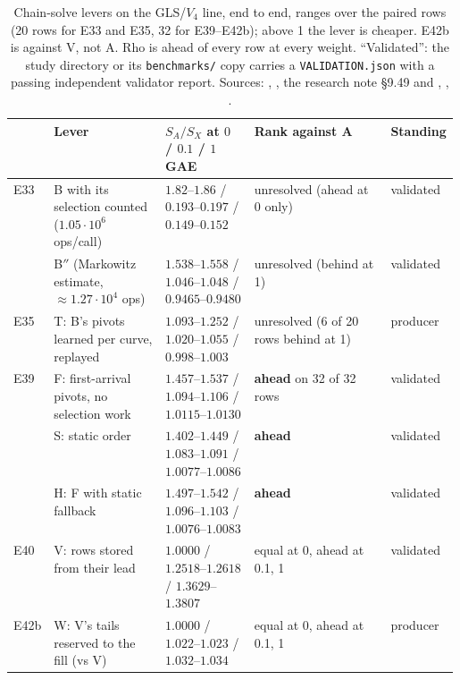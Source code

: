 \begin{table}[t]
\centering\small
\begin{tabularx}{\linewidth}{@{}l>{\raggedright}p{0.25\linewidth}>{\raggedright}p{0.2\linewidth}>{\raggedright}X>{\raggedright\arraybackslash}p{0.13\linewidth}@{}}
\toprule
& Lever & $S_A/S_X$ at $0$ / $0.1$ / $1$ GAE & Rank against A & Standing \\
\midrule
E33 & B with its selection counted ($1.05\cdot10^6$ ops/call) & $1.82$--$1.86$ / $0.193$--$0.197$ / $0.149$--$0.152$ & unresolved (ahead at 0 only) & validated \\
& B$''$ (Markowitz estimate, $\approx1.27\cdot10^4$ ops) & $1.538$--$1.558$ / $1.046$--$1.048$ / $0.9465$--$0.9480$ & unresolved (behind at 1) & validated \\
E35 & T: B's pivots learned per curve, replayed & $1.093$--$1.252$ / $1.020$--$1.055$ / $0.998$--$1.003$ & unresolved (6 of 20 rows behind at 1) & producer \\
E39 & F: first-arrival pivots, no selection work & $1.457$--$1.537$ / $1.094$--$1.106$ / $1.0115$--$1.0130$ & \textbf{ahead} on 32 of 32 rows & validated \\
& S: static order & $1.402$--$1.449$ / $1.083$--$1.091$ / $1.0077$--$1.0086$ & \textbf{ahead} & validated \\
& H: F with static fallback & $1.497$--$1.542$ / $1.096$--$1.103$ / $1.0076$--$1.0083$ & \textbf{ahead} & validated \\
E40 & V: rows stored from their lead & $1.0000$ / $1.2518$--$1.2618$ / $1.3629$--$1.3807$ & equal at 0, ahead at 0.1, 1 & validated \\
E42b & W: V's tails reserved to the fill (vs V) & $1.0000$ / $1.022$--$1.023$ / $1.032$--$1.034$ & equal at 0, ahead at 0.1, 1 & producer \\
\bottomrule
\end{tabularx}
\caption[]{Chain-solve levers on the GLS/$V_4$ line, end to end, ranges over
the paired rows (20 rows for E33 and E35, 32 for E39--E42b); above 1 the
lever is cheaper. E42b is against V, not A. Rho is ahead of every row at
every weight. ``Validated'': the study directory or its \texttt{benchmarks/}
copy carries a \texttt{VALIDATION.json} with a passing independent validator
report. Sources: ,
,
the research note \S9.49 and ,
,
.}
\label{tab:fe-levers}
\end{table}


